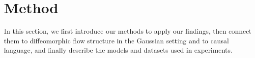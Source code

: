 \section{Method} 
\label{sec:method}
In this section, we first introduce our methods to apply our findings, then connect them to diffeomorphic flow structure in the Gaussian setting and to causal language, and finally describe the models and datasets used in experiments.






